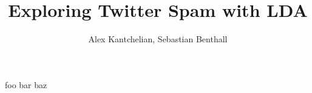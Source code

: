 \documentclass[12pt,a4paper]{article}
\author{Alex Kantchelian, Sebastian Benthall}
\title{Exploring Twitter Spam with LDA}
\begin{document}
\maketitle

foo bar baz
\end{document}
